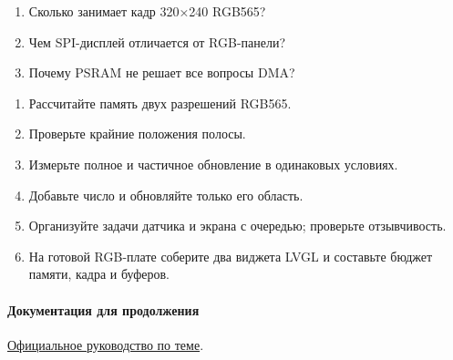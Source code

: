 \begin{selfcheck}
\begin{enumerate}
\item Сколько занимает кадр 320×240 RGB565?
\item Чем SPI-дисплей отличается от RGB-панели?
\item Почему PSRAM не решает все вопросы DMA?
\end{enumerate}
\end{selfcheck}
\begin{tasks}
\begin{enumerate}
\item {} Рассчитайте память двух разрешений RGB565.
\item {} Проверьте крайние положения полосы.
\item {} Измерьте полное и частичное обновление в одинаковых условиях.
\item {} Добавьте число и обновляйте только его область.
\item {} Организуйте задачи датчика и экрана с очередью; проверьте отзывчивость.
\item {} На готовой RGB-плате соберите два виджета LVGL и составьте бюджет памяти, кадра и буферов.
\end{enumerate}
\end{tasks}

\paragraph{Документация для продолжения}\href{https://docs.espressif.com/projects/esp-idf/en/v5.4/esp32s3/api-reference/peripherals/lcd/rgb_lcd.html}{Официальное руководство по теме}.
